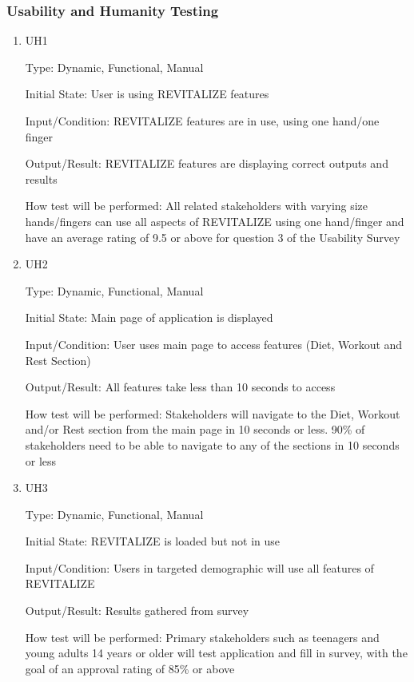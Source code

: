\documentclass[12pt, titlepage]{article}
\begin{document}
\subsubsection{Usability and Humanity Testing}

\begin{enumerate}

\item{UH1\\}

Type: Dynamic, Functional, Manual
					
Initial State: User is using REVITALIZE features
					
Input/Condition: REVITALIZE features are in use, using one hand/one finger
					
Output/Result: REVITALIZE features are displaying correct outputs and results
					
How test will be performed: All related stakeholders with varying size hands/fingers can use all aspects of REVITALIZE using one hand/finger and have an average rating of 9.5 or above for question 3 of the Usability Survey
					
\item{UH2\\}

Type: Dynamic, Functional, Manual
					
Initial State: Main page of application is displayed
					
Input/Condition: User uses main page to access features (Diet, Workout and Rest Section)
					
Output/Result: All features take less than 10 seconds to access
					
How test will be performed: Stakeholders will navigate to the Diet, Workout and/or Rest section from the main page in 10 seconds or less. 90\% of stakeholders need to be able to navigate to any of the sections in 10 seconds or less

\item{UH3\\}

Type: Dynamic, Functional, Manual
					
Initial State: REVITALIZE is loaded but not in use
					
Input/Condition: Users in targeted demographic will use all features of REVITALIZE
					
Output/Result: Results gathered from survey
					
How test will be performed: Primary stakeholders such as teenagers and young adults 14 years or older will test application and fill in survey, with the goal of an approval rating of 85\% or above


\end{enumerate}
\end{document}
